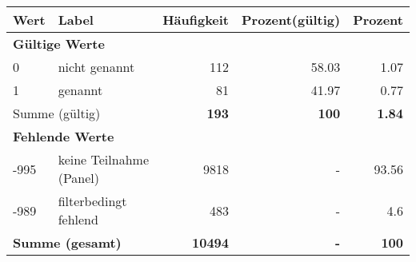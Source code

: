      \begin{longtable}{lXrrr}
     \toprule
     \textbf{Wert} & \textbf{Label} & \textbf{Häufigkeit} & \textbf{Prozent(gültig)} & \textbf{Prozent} \\
     \endhead
     \midrule
     \multicolumn{5}{l}{\textbf{Gültige Werte}}\\

     0 &
     \multicolumn{1}{X}{ nicht genannt   } &


       \num{112} &
       \num[round-mode=places,round-precision=2]{58,03} &
         \num[round-mode=places,round-precision=2]{1,07} \\

     1 &
     \multicolumn{1}{X}{ genannt   } &


       \num{81} &
       \num[round-mode=places,round-precision=2]{41,97} &
         \num[round-mode=places,round-precision=2]{0,77} \\
     \midrule
     \multicolumn{2}{l}{Summe (gültig)} &
       \textbf{\num{193}} &
     \textbf{100} &
       \textbf{\num[round-mode=places,round-precision=2]{1,84}} \\
     \multicolumn{5}{l}{\textbf{Fehlende Werte}}\\
       -995 &
       keine Teilnahme (Panel) &
         \num{9818} &
        - &
         \num[round-mode=places,round-precision=2]{93,56} \\
       -989 &
       filterbedingt fehlend &
         \num{483} &
        - &
         \num[round-mode=places,round-precision=2]{4,6} \\
     \midrule
     \multicolumn{2}{l}{\textbf{Summe (gesamt)}} &
          \textbf{\num{10494}} &
        \textbf{-} &
        \textbf{100} \\
     \bottomrule
     \end{longtable}
     
